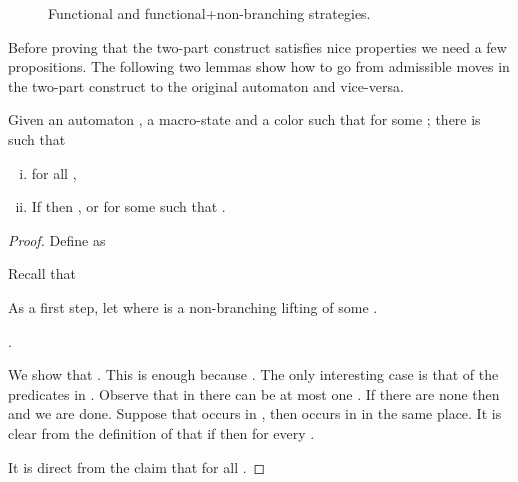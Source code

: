 \begin{figure}\centering
{}
\caption{Functional and functional+non-branching strategies.}
\end{figure}
 
Before proving that the two-part construct satisfies nice properties we need a few propositions. The following two lemmas show how to go from admissible moves in the two-part construct to the original automaton and vice-versa.

\begin{lemma}\label{lem:os-nd-to-alt}
	Given an automaton , a macro-state  and a color  such that  for some ; there is  such that
		\begin{enumerate}[(i)]
			 pt
			\item  for all ,
			\item If  then
				, or
				 for some  such that .
		\end{enumerate}
\end{lemma}
\begin{proof}
	Define  as
	
	Recall that
	
As a first step, let  where  is a non-branching lifting of some .

	\begin{claimfirst}
		.
	\end{claimfirst}
\begin{pfclaim}
		We show that . This is enough because . The only interesting case is that of the predicates in . Observe that in  there can be at most one . If there are none then  and we are done. Suppose that  occurs in , then  occurs in  in the same place. It is clear from the definition of  that if  then  for every .
	\end{pfclaim}
It is direct from the claim that  for all .
\end{proof}

